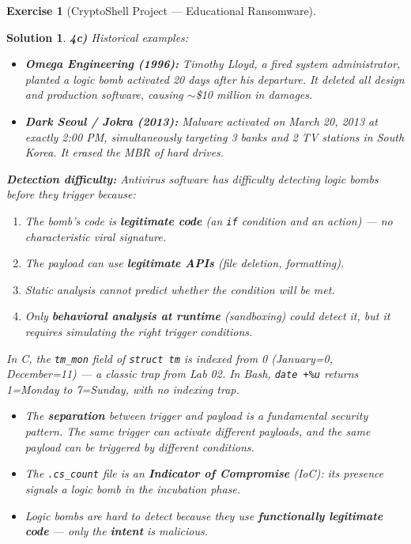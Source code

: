 \documentclass[a4paper,11pt]{article}
\theoremstyle{plain}
\newtheorem{correction}{Solution}
\theoremstyle{definition}
\newtheorem{exercice}{Exercise}
\begin{document}
\begin{exercice}[CryptoShell Project --- Educational Ransomware]
\begin{correction}
\textbf{4c)} Historical examples:
\begin{itemize}
    \item \textbf{Omega Engineering (1996):} Timothy Lloyd, a fired system administrator, planted a logic bomb activated 20 days after his departure. It deleted all design and production software, causing $\sim$\$10 million in damages.
    \item \textbf{Dark Seoul / Jokra (2013):} Malware activated on March 20, 2013 at exactly 2:00 PM, simultaneously targeting 3 banks and 2 TV stations in South Korea. It erased the MBR of hard drives.
\end{itemize}

\textbf{Detection difficulty:} Antivirus software has difficulty detecting logic bombs \textit{before} they trigger because:
\begin{enumerate}
    \item The bomb's code is \textbf{legitimate code} (an \texttt{if} condition and an action) --- no characteristic viral signature.
    \item The payload can use \textbf{legitimate APIs} (file deletion, formatting).
    \item Static analysis cannot predict whether the condition will be met.
    \item Only \textbf{behavioral analysis at runtime} (sandboxing) could detect it, but it requires simulating the right trigger conditions.
\end{enumerate}

\begin{attention}
In C, the \texttt{tm\_mon} field of \texttt{struct tm} is indexed from 0 (January=0, December=11) --- a classic trap from Lab 02. In Bash, \texttt{date +\%u} returns 1=Monday to 7=Sunday, with no indexing trap.
\end{attention}

\begin{pointcle}
\begin{itemize}
    \item The \textbf{separation} between trigger and payload is a fundamental security pattern. The same trigger can activate different payloads, and the same payload can be triggered by different conditions.
    \item The \texttt{.cs\_count} file is an \textbf{Indicator of Compromise} (IoC): its presence signals a logic bomb in the incubation phase.
    \item Logic bombs are hard to detect because they use \textbf{functionally legitimate code} --- only the \textbf{intent} is malicious.
\end{itemize}
\end{pointcle}


\end{correction}
\end{exercice}
\end{document}
